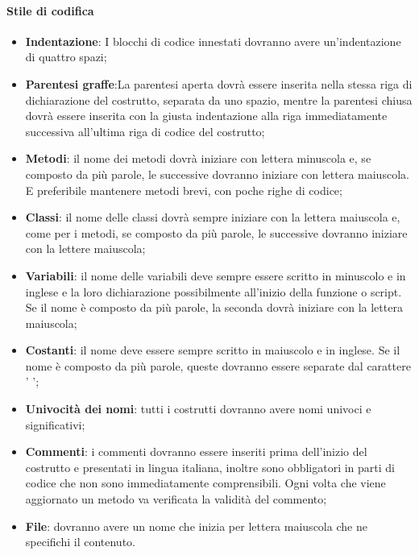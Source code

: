 \paragraph{Stile di codifica}
	\begin{itemize}
		\item \textbf{Indentazione}: I blocchi di codice innestati dovranno avere un’indentazione di quattro spazi;
		\item \textbf{Parentesi graffe}:La parentesi aperta dovrà essere inserita nella stessa riga di dichiarazione del costrutto, separata da uno spazio, mentre la parentesi chiusa dovrà essere inserita con la giusta indentazione alla riga immediatamente successiva all’ultima riga di codice del costrutto;
		\item \textbf{Metodi}: il nome dei metodi dovrà iniziare con lettera minuscola e, se composto da più parole,
			le successive dovranno iniziare con lettera maiuscola. E preferibile mantenere metodi brevi, con
			poche righe di codice; 
		\item \textbf{Classi}: il nome delle classi dovrà sempre iniziare con la lettera maiuscola e, come per i metodi,
			se composto da più parole, le successive dovranno iniziare con la lettere maiuscola;
		\item \textbf{Variabili}: il nome delle variabili deve sempre essere scritto in minuscolo e in inglese e la loro dichiarazione possibilmente all'inizio della funzione o script. Se il nome è composto da più parole, la seconda dovrà iniziare con la lettera maiuscola;
		\item \textbf{Costanti}: il nome deve essere sempre scritto in maiuscolo e in inglese. Se il nome è composto da più parole, queste dovranno essere separate dal carattere ’ \textunderscore’;
		\item \textbf{Univocità dei nomi}: tutti i costrutti dovranno avere nomi univoci e significativi;
		\item \textbf{Commenti}: i commenti dovranno essere inseriti prima dell’inizio del costrutto e presentati in lingua italiana, inoltre sono obbligatori in parti di codice che non sono immediatamente comprensibili. Ogni volta che viene aggiornato un metodo va verificata la validità del commento;
		\item \textbf{File}: dovranno avere un nome che inizia per lettera maiuscola che ne specifichi il contenuto.
	\end{itemize}
	
